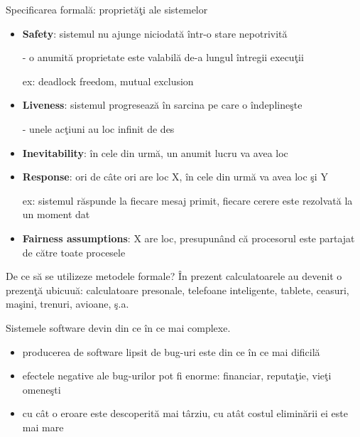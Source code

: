 \documentclass{beamer}
\begin{document}
\begin{frame}{Specificarea formală: proprietăţi ale sistemelor}
\begin{itemize}
\item
\textbf{Safety}: sistemul nu ajunge niciodată într-o stare nepotrivită 

- o anumită proprietate este valabilă de-a lungul întregii execuţii

ex: deadlock freedom, mutual exclusion

\item
\textbf{Liveness}: sistemul progresează în sarcina pe care o îndeplineşte

- unele acţiuni au loc infinit de des

\item
\textbf{Inevitability}: în cele din urmă, un anumit lucru va avea loc
\item
\textbf{Response}: ori de câte ori are loc X, în cele din urmă va avea loc şi Y

ex: sistemul răspunde la fiecare mesaj primit, fiecare cerere este rezolvată la un moment dat

\item
\textbf{Fairness assumptions}: X are loc, presupunând că procesorul este partajat de către toate procesele
\end{itemize}
\end{frame}



\begin{frame}{De ce să se utilizeze metodele formale?}
În prezent calculatoarele au devenit o prezenţă ubicuuă: calculatoare presonale, telefoane inteligente, tablete, ceasuri, maşini, trenuri, avioane, ş.a.

\vspace{0.5cm}

Sistemele software devin din ce în ce mai complexe.

\begin{itemize}
\item
producerea de software lipsit de bug-uri este din ce în ce mai dificilă
\item
efectele negative ale bug-urilor pot fi enorme: financiar, reputaţie, vieţi omeneşti
\item
cu cât o eroare este descoperită mai târziu, cu atât costul eliminării ei este mai mare
\end{itemize}
\end{frame}
\end{document}
